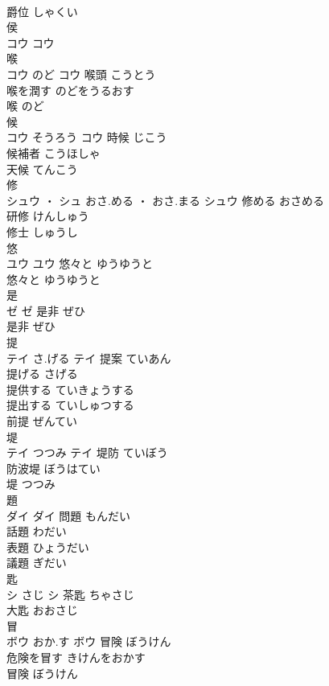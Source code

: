 \documentclass[8pt]{extreport}
\begin{document}
\begin{CJK}{UTF8}{min}
\\	爵位	しゃくい	
\\	侯	
\\	コウ		コウ																																			
\\	喉	
\\	コウ	のど	コウ	喉頭	こうとう	
\\	喉を潤す	のどをうるおす	
\\	喉	のど	
\\	候	
\\	コウ	そうろう	コウ	時候	じこう	
\\	候補者	こうほしゃ	
\\	天候	てんこう	
\\	修	
\\	シュウ ・ シュ	おさ.める ・ おさ.まる	シュウ	修める	おさめる	
\\	研修	けんしゅう	
\\	修士	しゅうし	
\\	悠	
\\	ユウ		ユウ	悠々と	ゆうゆうと	
\\	悠々と	ゆうゆうと	
\\	是	
\\	ゼ		ゼ	是非	ぜひ	
\\	是非	ぜひ	
\\	提	
\\	テイ	さ.げる	テイ	提案	ていあん	
\\	提げる	さげる	
\\	提供する	ていきょうする	
\\	提出する	ていしゅつする	
\\	前提	ぜんてい	
\\	堤	
\\	テイ	つつみ	テイ	堤防	ていぼう	
\\	防波堤	ぼうはてい	
\\	堤	つつみ	
\\	題	
\\	ダイ		ダイ	問題	もんだい	
\\	話題	わだい	
\\	表題	ひょうだい	
\\	議題	ぎだい	
\\	匙	
\\	シ	さじ	シ													茶匙	ちゃさじ	
\\	大匙	おおさじ	
\\	冒	
\\	ボウ	おか.す	ボウ	冒険	ぼうけん	
\\	危険を冒す	きけんをおかす	
\\	冒険	ぼうけん	

\end{CJK}
\end{document}
